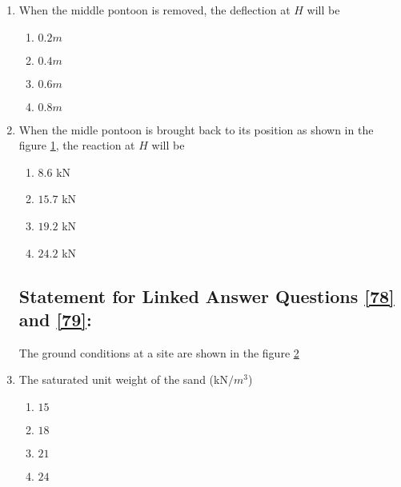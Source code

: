 \documentclass[journal]{IEEEtran}
\begin{document}
\begin{enumerate}
        \subsection*{Statement for Linked Answer Questions \ref{76} and \ref{77}:}
        Beam $GHI$ is supported by three pontoons as shown in the figure \ref{76-77}. The horizontal cross-sectional area of each pontoon is $8m^2$, the flexural rigidity of the beam is $10000$ kN-$m^2$ and the unit weight of water is $10$ kN$/m^3$.
        \begin{figure}[H]
            \centering
            
            \caption{}
            \label{76-77}
        \end{figure}
        \item \label{76} When the middle pontoon is removed, the deflection at $H$ will be
                \begin{enumerate}
                    \item $0.2m$
                    \item $0.4m$
                    \item $0.6m$
                    \item $0.8m$
                \end{enumerate}

            \item \label{77} When the midle pontoon is brought back to its position as shown in the figure \ref{76-77}, the reaction at $H$ will be
                \begin{enumerate}
                    \item $8.6$ kN
                    \item $15.7$ kN
                    \item $19.2$ kN
                    \item $24.2$ kN
                \end{enumerate}

    \subsection*{Statement for Linked Answer Questions \ref{78} and \ref{79}:}
    The ground conditions at a site are shown in the figure \ref{78-79}
    \begin{figure}[H]
        \centering
        
        \caption{}
        \label{78-79}
    \end{figure}

    \item \label{78} The saturated unit weight of the sand (kN$/m^3$)
        \begin{enumerate}
            \item $15$
            \item $18$
            \item $21$
            \item $24$
        \end{enumerate}


\end{enumerate}
\end{document}
